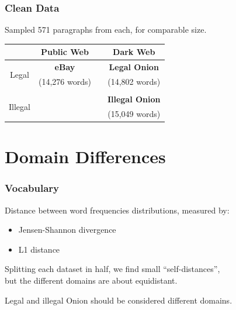 \documentclass[t,xcolor={svgnames,table}]{beamer}
\begin{document}
\begin{frame}
	\frametitle{Clean Data}

	Sampled 571 paragraphs from each, for comparable size.
	
	\begin{center}
	\def\arraystretch{2}
	\begin{tabular}{c|ccc}
	& Public Web && Dark Web \\ 
	\hline
	\multirow{2}{*}{Legal} & \textbf{\color{yellow} eBay} && \textbf{\color{green} Legal Onion} \\
	& (14,276 words) && (14,802 words) \\\\
	\multirow{2}{*}{Illegal} &&& \textbf{\color{red} Illegal Onion} \\
	&&& (15,049 words)
	\end{tabular}
	\end{center}
\end{frame}

\section{Domain Differences}

\begin{frame}
	\frametitle{Vocabulary}
	Distance between word frequencies distributions, measured by:
	\begin{minipage}{.45\textwidth}
		\begin{itemize}
			\item Jensen-Shannon divergence
		\end{itemize}
	\end{minipage}\hfill
	\begin{minipage}{.45\textwidth}
		\begin{itemize}
			\item L1 distance
		\end{itemize}
	\end{minipage}
	\vfill
	
	Splitting each dataset in half, we find small ``self-distances''{\pause}, \\ 
	but the different domains are about equidistant.
	
	\begin{center}
	\end{center}
	\pause
	
	Legal and illegal Onion should be considered different domains.
\end{frame}
\end{document}
